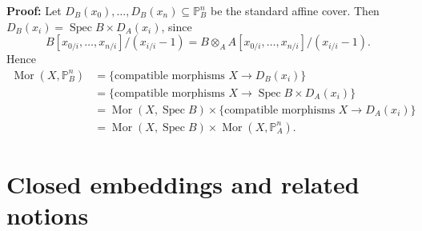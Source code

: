 \documentclass{report}
\renewcommand{\P}{\mathbb{P}} %
\DeclareMathOperator{\Mor}{Mor}
\DeclareMathOperator{\Spec}{Spec}
\begin{document}
\begin{enumerate}[label=\textbf{7.4.\Alph*.}]
	      \textbf{Proof:} Let $D_B(x_0),\ldots,D_B(x_n)\subseteq\P^n_B$ be the
	      standard affine cover. Then $D_B(x_i)=\Spec B\times D_A(x_i)$,
	      since
	      \begin{equation*}
		      B[x_{0/i},\ldots,x_{n/i}]/(x_{i/i}-1)
		      = B\otimes_AA[x_{0/i},\ldots,x_{n/i}]/(x_{i/i}-1).
	      \end{equation*}
	      Hence
	      \begin{align*}
		      \Mor(X,\P^n_B)
		       & = \{\text{compatible morphisms
		      $X\to D_B(x_i)$}\}                                     \\
		       & = \{\text{compatible morphisms
		      $X\to\Spec B\times D_A(x_i)$}\}                        \\
		       & = \Mor(X,\Spec B)\times\{\text{compatible morphisms
		      $X\to D_A(x_i)$}\}                                     \\
		       & = \Mor(X,\Spec B)\times\Mor(X,\P^n_A).
	      \end{align*}
\end{enumerate}

\chapter{Closed embeddings and related notions}
\end{document}
